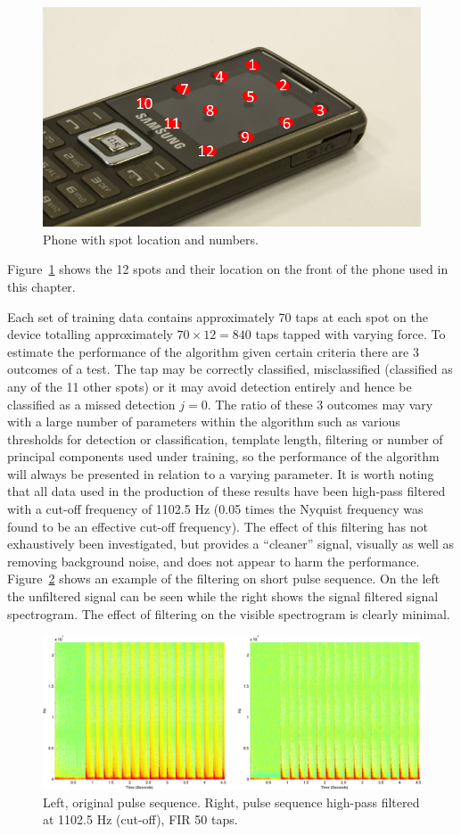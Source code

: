 \begin{figure}[!]
\centering
\includegraphics[width=300 px]{phoneDisplayNum.png}
\caption{Phone with spot location and numbers.}\label{fig:phoneDisplayNum}
\end{figure}

Figure~\ref{fig:phoneDisplayNum} shows the 12 spots and their location on the front of the phone used in this chapter.

Each set of training data contains approximately 70 taps\label{corrections:DSNcount} at each spot on the device totalling approximately $70 \times 12 = 840$ taps tapped with varying force. To estimate the performance of the algorithm given certain criteria there are 3 outcomes of a test. The tap may be correctly classified, misclassified (classified as any of the 11 other spots) or it may avoid detection entirely and hence be classified as a missed detection $j=0$. The ratio of these 3 outcomes may vary with a large number of parameters within the algorithm such as various thresholds for detection or classification, template length, filtering or number of principal components used under training, so the performance of the algorithm will always be presented in relation to a varying parameter. It is worth noting that all data used in the production of these results have been high-pass filtered with a cut-off frequency of 1102.5 Hz (0.05 times the Nyquist frequency was found to be an effective cut-off frequency\label{corrections:cut-off}). The effect of this filtering has not exhaustively been investigated, but provides a ``cleaner'' signal, visually as well as removing background noise, and does not appear to harm the performance. Figure~\ref{fig:filterCompareSpectrogram} shows an example of the filtering on short pulse sequence. On the left the unfiltered signal can be seen while the right shows the signal filtered signal spectrogram. The effect of filtering on the visible spectrogram is clearly minimal.

\begin{figure}[!]
\centering
\includegraphics[width=410 px]{filterCompareSpectrogram.png}
\caption{Left, original pulse sequence. Right, pulse sequence high-pass filtered at 1102.5 Hz (cut-off), FIR 50 taps.}\label{fig:filterCompareSpectrogram}
\end{figure}


